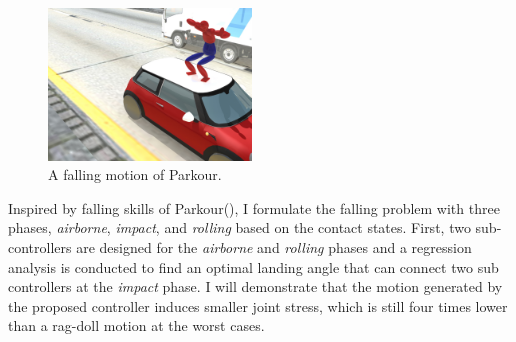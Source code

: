 \begin{figure}
 \vspace{-25pt}
  \begin{center}
    \includegraphics[width=0.48\textwidth]{images/intro_landing.jpg}
  \end{center}
   \vspace{-25pt}
  \caption{A falling motion of Parkour.}
  \label{fig:intro_landing}
   \vspace{-10pt}
\end{figure}
Inspired by falling skills of Parkour(), 
I formulate the falling problem
with three phases, \emph{airborne}, \emph{impact}, and \emph{rolling}
based on the contact states.
First, two sub-controllers are designed for the \emph{airborne} and
\emph{rolling} phases and a regression analysis is conducted to find 
an optimal landing angle that can connect two sub controllers at the
\emph{impact} phase.
I will demonstrate that the motion generated by the proposed controller
induces smaller joint stress, which is still four times lower than a rag-doll
motion at the worst cases.



